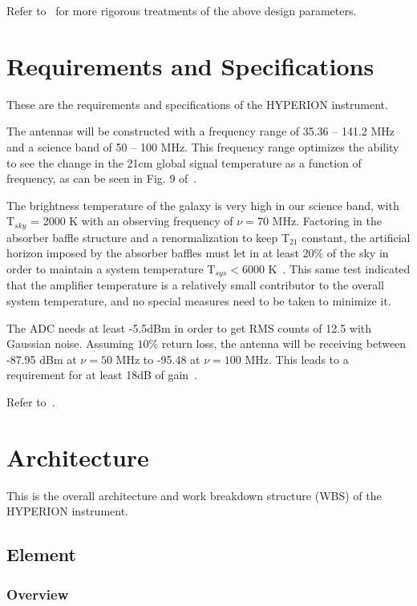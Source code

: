 \documentclass[11pt]{report}
\begin{document}
Refer to~\citep{presley2015, liu2013, venumadhav2016} for more rigorous 
treatments of the above design parameters.

\chapter{Requirements and Specifications}

These are the requirements and specifications of the HYPERION instrument. 

The antennas will be constructed with a frequency range of 35.36 -- 141.2 MHz 
and a science band of 50 -- 100 MHz. This frequency range optimizes the ability 
to see the change in the 21cm global signal temperature as a function of 
frequency, as can be seen in Fig. 9 of~\citep{pritchard-loeb2010}. 

The brightness temperature of the galaxy is very high in our science band, with 
T$_{sky}$ = 2000 K with an observing frequency of $\nu = 70$ MHz. Factoring in 
the absorber baffle structure and a renormalization to keep T$_{21}$ constant, 
the artificial horizon imposed by the absorber baffles must let in at least 
$20\%$ of the sky in order to maintain a system temperature T$_{sys} < 6000$ 
K~\citep{kundert2016}.  This same test indicated that the amplifier temperature 
is a relatively small contributor to the overall system temperature, and no 
special measures need to be taken to minimize it.

The ADC needs at least -5.5dBm in order to get RMS counts of 12.5 with Gaussian 
noise. Assuming $10\%$ return loss, the antenna will be receiving between 
-87.95 dBm at $\nu = 50$ MHz to -95.48 at $\nu = 100$ MHz. This leads to a 
requirement for at least 18dB of gain~\citep{day2016}.

Refer to~\citep{sys-specs, kundert2016}.

\chapter{Architecture}

This is the overall architecture and work breakdown structure (WBS) of the 
HYPERION instrument.

\section{Element}

\subsection{Overview}
\end{document}
